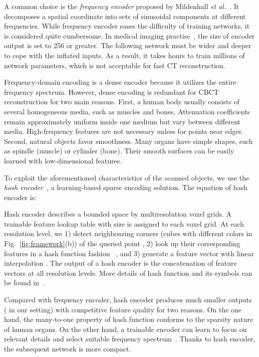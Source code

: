 \documentclass[runningheads]{llncs}
\begin{document}
A common choice is the \textit{frequency encoder} proposed by Mildenhall \textit{et al.}~\cite{mildenhall2020nerf}. It decomposes a spatial coordinate  into  sets of sinusoidal components at different frequencies. While frequency encoder eases the difficulty of training networks, it is considered quite cumbersome. In medical imaging practise~\cite{wu2021irem,zang2021intratomo}, the size of encoder output is set to 256 or greater. The following network must be wider and deeper to cope with the inflated inputs. As a result, it takes hours to train millions of network parameters, which is not acceptable for fast CT reconstruction.

Frequency-domain encoding is a dense encoder because it utilizes the entire frequency spectrum. However, dense encoding is redundant for CBCT reconstruction for two main reasons. First, a  human body usually consists of several homogeneous media, such as muscles and bones. Attenuation coefficients remain approximately uniform inside one medium but vary between different media. High-frequency features are not necessary unless for points near edges. Second, natural objects favor smoothness. Many organs have simple shapes, such as spindle (muscle) or cylinder (bone). Their smooth surfaces can be easily learned with low-dimensional features. 

To exploit the aforementioned characteristics of the scanned objects, we use the \textit{hash encoder}~\cite{mueller2022instant}, a learning-based sparse encoding solution. The equation of hash encoder  is: 

Hash encoder describes a bounded space by  multiresolution voxel grids. A trainable feature lookup table  with size  is assigned to each voxel grid. At each resolution level, we 1) detect neighbouring corners   (cubes with different colors in Fig.~\ref{fig:framework}(b)) of the queried point , 2) look up their corresponding features  in a hash function fashion ~\cite{teschner2003optimized}, and 3) generate a feature vector with linear interpolation . The output of a hash encoder is the concatenation of feature vectors at all resolution levels. More details of hash function and its symbols can be found in~\cite{mueller2022instant}.

Compared with frequency encoder, hash encoder produces much smaller outputs ( in our setting) with competitive feature quality for two reasons. On the one hand, the many-to-one property of hash function conforms to the sparsity nature of human organs. On the other hand, a trainable encoder can learn to focus on relevant details and select suitable frequency spectrum~\cite{mueller2022instant}. Thanks to hash encoder, the subsequent network 
is more compact.
\end{document}
